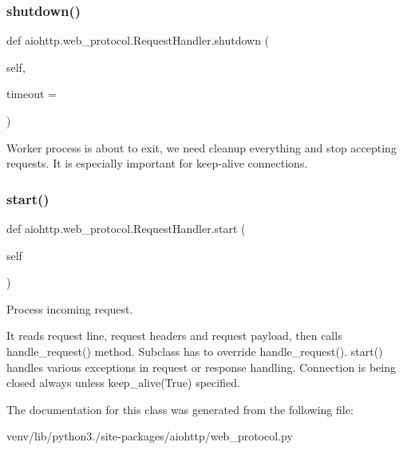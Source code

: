 \subsubsection{\texorpdfstring{shutdown()}{shutdown()}}
{\footnotesize\ttfamily def aiohttp.\+web\+\_\+protocol.\+Request\+Handler.\+shutdown (\begin{DoxyParamCaption}\item[{}]{self,  }\item[{}]{timeout = {} }\end{DoxyParamCaption})}

\begin{DoxyVerb}Worker process is about to exit, we need cleanup everything and
stop accepting requests. It is especially important for keep-alive
connections.\end{DoxyVerb}
 \mbox{\label{classaiohttp_1_1web__protocol_1_1_request_handler_a9360c259487f6581c6a979e9c1031e68}} 
\subsubsection{\texorpdfstring{start()}{start()}}
{\footnotesize\ttfamily def aiohttp.\+web\+\_\+protocol.\+Request\+Handler.\+start (\begin{DoxyParamCaption}\item[{}]{self }\end{DoxyParamCaption})}

\begin{DoxyVerb}Process incoming request.

It reads request line, request headers and request payload, then
calls handle_request() method. Subclass has to override
handle_request(). start() handles various exceptions in request
or response handling. Connection is being closed always unless
keep_alive(True) specified.
\end{DoxyVerb}
 

The documentation for this class was generated from the following file\+:\begin{DoxyCompactItemize}
\item 
venv/lib/python3./site-\/packages/aiohttp/web\+\_\+protocol.\+py\end{DoxyCompactItemize}
